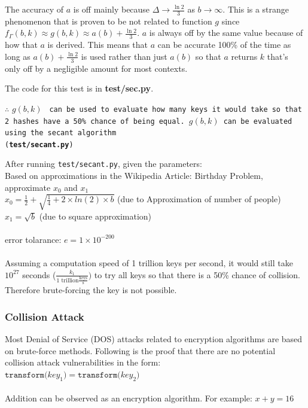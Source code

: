 \documentclass[11pt]{article}
\theoremstyle{definition}
\theoremstyle{remark}
\begin{document}
The accuracy of $a$ is off mainly because $\Delta \rightarrow \frac{\ln 2}{3}$ as $b \rightarrow \infty$. This is a strange phenomenon that is proven to be not related to function $g$ since $f_{\Gamma}(b, k) \approx g(b, k) \approx a(b) + \frac{\ln 2}{3}$. $a$ is always off by the same value because of how that $a$ is derived. This means that $a$ can be accurate 100\% of the time as long as $a(b) + \frac{\ln 2}{3}$ is used rather than just $a(b)$ so that $a$ returns $k$ that's only off by a negligible amount for most contexts.

The code for this test is in \textbf{test/sec.py}.

$\therefore$ $g(b, k)$ \texttt{ can be used to evaluate how many keys it would take so that 2 hashes have a 50\% chance of being equal. $g(b, k)$ can be evaluated using the secant algorithm\\ (\textbf{test/secant.py})}

After running \texttt{test/secant.py}, given the parameters: \\
Based on approximations in the Wikipedia Article: Birthday Problem, approximate $x_0$ and $x_1$ \\
$x_0 = \frac{1}{2}+\sqrt{\frac{1}{4}+2 \times ln(2) \times b}$ (due to Approximation of number of people) \\
$x_1 = \sqrt{b}$ (due to square approximation) \\
\\ error tolarance:
$e = 1 \times 10^{-200}$ \\
\\
Assuming a computation speed of 1 trillion keys per second, it would still take $10^{27}$ seconds ($\frac{k_1}{\textrm{1 trillion} \mathrm{\frac{keys}{s}}})$ to try all keys so that there is a 50\% chance of collision. Therefore brute-forcing the key is not possible.

\subsubsection {Collision Attack} \label{collision_attack}

Most Denial of Service (DOS) attacks related to encryption algorithms are based on brute-force methods. Following is the proof that there are no potential collision attack vulnerabilities in the form: \\
$\texttt{transform(} key_1 \texttt{)} = \texttt{transform(} key_2 \texttt{)}$ \\
\\
Addition can be observed as an encryption algorithm. For example: $x + y = 16$ \\
\end{document}
